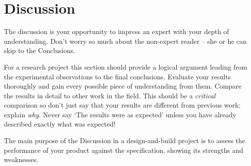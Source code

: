 \section{Discussion}

The discussion is your opportunity to impress an expert with your depth of understanding. Don't worry so much about the non-expert reader -- she or he can skip to the Conclusions.

For a research project this section should provide a logical argument leading from the experimental observations to the final conclusions. Evaluate your results thoroughly and gain every possible piece of understanding from them. Compare the results in detail to other work in the field. This should be a \emph{critical} comparison so don't just say that your results are different from previous work; explain \emph{why}. Never say `The results were as expected' unless you have already described exactly what was expected!

The main purpose of the Discussion in a design-and-build project is to assess the performance of your product against the specification, showing its strengths and weaknesses.
